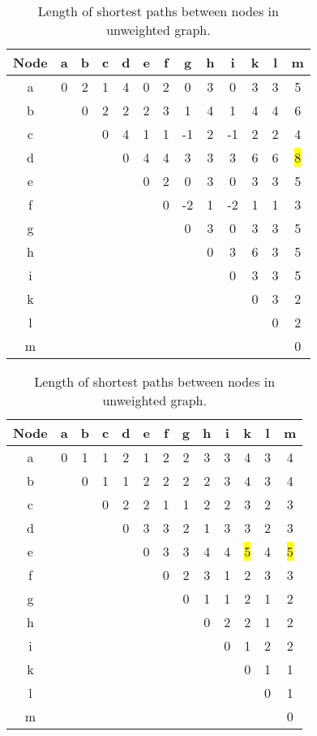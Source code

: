 \documentclass[a4paper,onecolumn,oneside]{article}
\begin{document}
\begin{table}[h]
\begin{subtable}
\centering
\begin{tabular}{c || c c c c c c c c c c c c}
Node & a& b& c& d& e& f& g& h& i& k& l& m\\
\hline \hline
a& 0& 2& 1& 4& 0& 2& 0& 3& 0& 3& 3& 5\\
b&  & 0& 2& 2& 2& 3& 1& 4& 1& 4& 4& 6\\
c&  &  & 0& 4& 1& 1&-1& 2&-1& 2& 2& 4\\
d&  &  &  & 0& 4& 4& 3& 3& 3& 6& 6& \colorbox{yellow}{8}\\
e&  &  &  &  & 0& 2& 0& 3& 0& 3& 3& 5\\
f&  &  &  &  &  & 0&-2& 1&-2& 1& 1& 3\\
g&  &  &  &  &  &  & 0& 3& 0& 3& 3& 5\\
h&  &  &  &  &  &  &  & 0& 3& 6& 3& 5\\
i&  &  &  &  &  &  &  &  & 0& 3& 3& 5\\
k&  &  &  &  &  &  &  &  &  & 0& 3& 2\\
l&  &  &  &  &  &  &  &  &  &  & 0& 2\\
m&  &  &  &  &  &  &  &  &  &  &  & 0\\
\end{tabular}
\caption{Length of shortest paths between nodes in weighted graph.}
\label{tbl:weighted-paths}
\end{subtable}
\qquad

\begin{subtable}
\centering
\begin{tabular}{c || c c c c c c c c c c c c}
Node & a& b& c& d& e& f& g& h& i& k& l& m\\
\hline \hline
a& 0& 1& 1& 2& 1& 2& 2& 3& 3& 4& 3& 4\\
b&  & 0& 1& 1& 2& 2& 2& 2& 3& 4& 3& 4\\
c&  &  & 0& 2& 2& 1& 1& 2& 2& 3& 2& 3\\
d&  &  &  & 0& 3& 3& 2& 1& 3& 3& 2& 3\\
e&  &  &  &  & 0& 3& 3& 4& 4& \colorbox{yellow}{5}& 4& \colorbox{yellow}{5}\\
f&  &  &  &  &  & 0& 2& 3& 1& 2& 3& 3\\
g&  &  &  &  &  &  & 0& 1& 1& 2& 1& 2\\
h&  &  &  &  &  &  &  & 0& 2& 2& 1& 2\\
i&  &  &  &  &  &  &  &  & 0& 1& 2& 2\\
k&  &  &  &  &  &  &  &  &  & 0& 1& 1\\
l&  &  &  &  &  &  &  &  &  &  & 0& 1\\
m&  &  &  &  &  &  &  &  &  &  &  & 0\\
\end{tabular}
\caption{Length of shortest paths between nodes in unweighted graph.}
\label{tbl:unweighted-paths}
\end{subtable}
\end{table}
\end{document}

